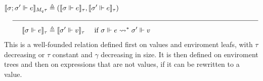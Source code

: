 \begin{definition}
\begin{equation}
\begin{aligned}[c]
  \llbracket \sigma; \sigma' \Vdash e \rrbracket_{M_q \tau} &\triangleq
    (\llbracket \sigma \Vdash e \rrbracket_{\tau}, \llbracket \sigma' \Vdash e
    \rrbracket_{\tau}) \\
  \rule{5em}{0.4pt}&\rule{30em}{0.4pt}\\
  \llbracket \sigma \Vdash e \rrbracket_{\tau} &\triangleq \llbracket \sigma'
    \Vdash v\rrbracket_{\tau} \quad{\text{ if } \sigma \Vdash e
    \rightsquigarrow^* \sigma' \Vdash v}
  \end{aligned}
  \end{equation}
  This is a well-founded relation defined first on values and enviroment leafs,
  with $\tau$ decreasing or $\tau$ constant and $\gamma$ decreasing in size. It
  is then defined on enviroment trees and then on expressions that are not
  values, if it can be rewritten to a value.
\end{definition}

